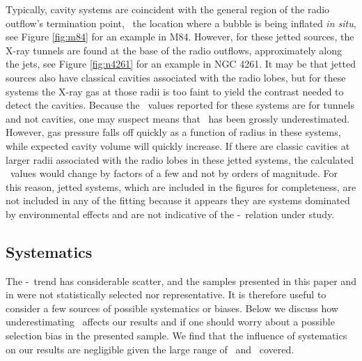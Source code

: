 \documentclass{emulateapj}
\begin{document}
Typically, cavity systems are coincident with the general region of
the radio outflow's termination point, \ie\ the location where a
bubble is being inflated {\it{in situ}}, see Figure \ref{fig:m84} for
an example in M84. However, for these jetted sources, the X-ray
tunnels are found at the base of the radio outflows, approximately
along the jets, see Figure \ref{fig:n4261} for an example in NGC
4261. It may be that jetted sources also have classical cavities
associated with the radio lobes, but for these systems the X-ray gas
at those radii is too faint to yield the contrast needed to detect the
cavities. Because the \pcav\ values reported for these systems are for
tunnels and not cavities, one may suspect means that \pcav\ has been
grossly underestimated. However, gas pressure falls off quickly as a
function of radius in these systems, while expected cavity volume will
quickly increase. If there are classic cavities at larger radii
associated with the radio lobes in these jetted systems, the
calculated \pcav\ values would change by factors of a few and not by
orders of magnitude. For this reason, jetted systems, which are
included in the figures for completeness, are not included in any of
the fitting because it appears they are systems dominated by
environmental effects and are not indicative of the
\pjet-\prad\ relation under study.

\subsection{Systematics}
\label{sec:sys}

The \pjet-\prad\ trend has considerable scatter, and the samples
presented in this paper and in \citet{birzan04} were not statistically
selected nor representative. It is therefore useful to consider a few
sources of possible systematics or biases. Below we discuss how
underestimating \pcav\ affects our results and if one should worry
about a possible selection bias in the presented sample. We find that
the influence of systematics on our results are negligible given the
large range of \pcav\ and \prad\ covered.
\end{document}
